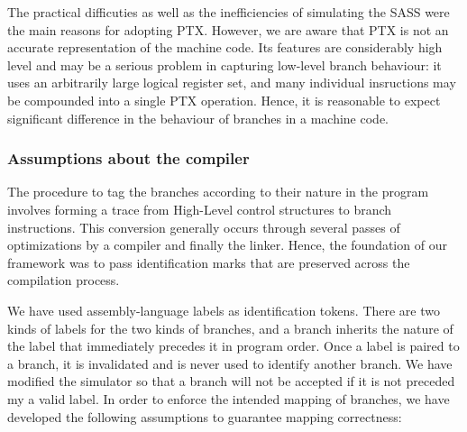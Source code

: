 	The practical difficuties as well as the inefficiencies of simulating the SASS were the main reasons for adopting PTX. However,
	we are aware that PTX is not an accurate representation of the machine code. Its features are considerably high level and may be a serious problem in capturing low-level branch behaviour: it uses an arbitrarily large logical register set, and many individual insructions may be compounded into a single PTX operation. Hence, it is reasonable to expect significant difference in the behaviour of branches in a machine code.

	\subsubsection*{Assumptions about the compiler}
	The procedure to tag the branches according to their nature in the program involves forming a trace from High-Level control
	structures to branch instructions. This conversion generally occurs through several passes of optimizations by a compiler 
	and finally the linker. Hence, the foundation of our framework was to pass identification marks that are preserved across
	the compilation process. 
	
	We have used assembly-language labels as identification tokens. There are two kinds of labels for the two kinds of branches, and a branch inherits the nature of the label that immediately precedes it in program order. Once a label is paired to a branch, it is invalidated and is never used to identify another branch. We have modified the simulator so that a branch will not be accepted if it is not preceded my a valid label. In order to enforce the intended mapping of branches, we have developed the following assumptions to guarantee mapping correctness:
		
